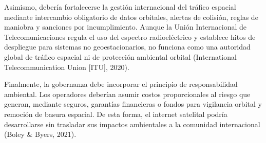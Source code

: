 Asimismo, debería fortalecerse la gestión internacional del tráfico espacial mediante intercambio obligatorio de datos orbitales, alertas de colisión, reglas de maniobra y sanciones por incumplimiento. Aunque la Unión Internacional de Telecomunicaciones regula el uso del espectro radioeléctrico y establece hitos de despliegue para sistemas no geoestacionarios, no funciona como una autoridad global de tráfico espacial ni de protección ambiental orbital (International Telecommunication Union [ITU], 2020).

Finalmente, la gobernanza debe incorporar el principio de responsabilidad ambiental. Los operadores deberían asumir costos proporcionales al riesgo que generan, mediante seguros, garantías financieras o fondos para vigilancia orbital y remoción de basura espacial. De esta forma, el internet satelital podría desarrollarse sin trasladar sus impactos ambientales a la comunidad internacional (Boley \& Byers, 2021).